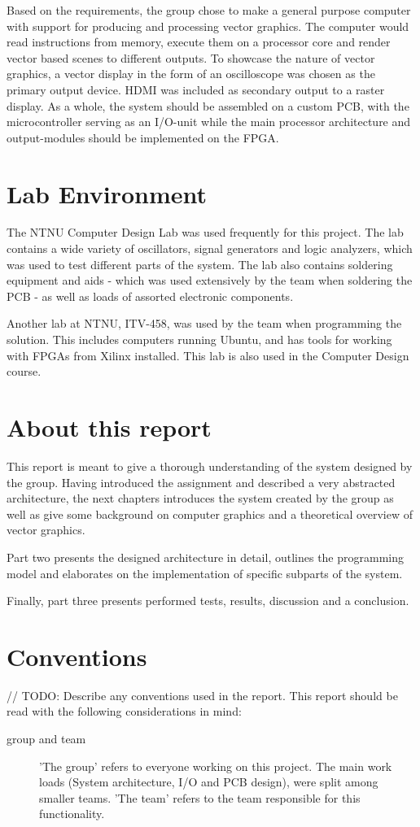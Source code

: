 Based on the requirements, the group chose to make a general purpose computer with support for producing and processing vector graphics.
The computer would read instructions from memory, execute them on a processor core and render vector based scenes to different outputs.
To showcase the nature of vector graphics, a vector display in the form of an oscilloscope was chosen as the primary output device.
HDMI was included as secondary output to a raster display.
As a whole, the system should be assembled on a custom PCB, with the microcontroller serving as an I/O-unit while the main processor architecture and output-modules should be implemented on the FPGA.

\section{Lab Environment}
The NTNU Computer Design Lab was used frequently for this project. The lab contains a wide variety of oscillators, signal generators and logic analyzers, which was used to test different parts of the system. The lab also contains soldering equipment and aids - which was used extensively by the team when soldering the PCB - as well as loads of assorted electronic components.

Another lab at NTNU, ITV-458, was used by the team when programming the solution. This includes computers running Ubuntu, and has tools for working with FPGAs from Xilinx installed. This lab is also used in the Computer Design course.

\section{About this report}
This report is meant to give a thorough understanding of the system designed by the group.
Having introduced the assignment and described a very abstracted architecture, the next chapters introduces the system created by the group as well as give some background on computer graphics and a theoretical overview of vector graphics.

Part two presents the designed architecture in detail, outlines the programming model and elaborates on the implementation of specific subparts of the system.

Finally, part three presents performed tests, results, discussion and a conclusion.

\section{Conventions}
// TODO: Describe any conventions used in the report.
This report should be read with the following considerations in mind:

\begin{description}
    \item[group and team] 'The group' refers to everyone working on this project. The main work loads (System architecture, I/O and PCB design), were split among smaller teams. 'The team' refers to the team responsible for this functionality.
\end{description}

